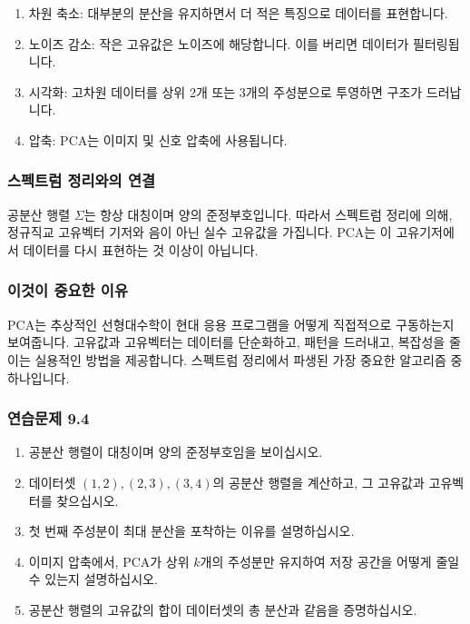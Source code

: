 \documentclass[
  12pt,
  a4paper,
]{article}
\begin{document}
\begin{enumerate}
\def\labelenumi{\arabic{enumi}.}
\item
  차원 축소: 대부분의 분산을 유지하면서 더 적은 특징으로 데이터를 표현합니다.
\item
  노이즈 감소: 작은 고유값은 노이즈에 해당합니다. 이를 버리면 데이터가 필터링됩니다.
\item
  시각화: 고차원 데이터를 상위 2개 또는 3개의 주성분으로 투영하면 구조가 드러납니다.
\item
  압축: PCA는 이미지 및 신호 압축에 사용됩니다.
\end{enumerate}

\subsubsection{스펙트럼 정리와의 연결}\label{connection-to-the-spectral-theorem}

공분산 행렬 \(\Sigma\)는 항상 대칭이며 양의 준정부호입니다. 따라서 스펙트럼 정리에 의해, 정규직교 고유벡터 기저와 음이 아닌 실수 고유값을 가집니다. PCA는 이 고유기저에서 데이터를 다시 표현하는 것 이상이 아닙니다.

\subsubsection{이것이 중요한 이유}\label{why-this-matters-35}

PCA는 추상적인 선형대수학이 현대 응용 프로그램을 어떻게 직접적으로 구동하는지 보여줍니다. 고유값과 고유벡터는 데이터를 단순화하고, 패턴을 드러내고, 복잡성을 줄이는 실용적인 방법을 제공합니다. 스펙트럼 정리에서 파생된 가장 중요한 알고리즘 중 하나입니다.

\subsubsection{연습문제 9.4}\label{exercises-94}

\begin{enumerate}
\def\labelenumi{\arabic{enumi}.}
\item
  공분산 행렬이 대칭이며 양의 준정부호임을 보이십시오.
\item
  데이터셋 \((1,2), (2,3), (3,4)\)의 공분산 행렬을 계산하고, 그 고유값과 고유벡터를 찾으십시오.
\item
  첫 번째 주성분이 최대 분산을 포착하는 이유를 설명하십시오.
\item
  이미지 압축에서, PCA가 상위 \(k\)개의 주성분만 유지하여 저장 공간을 어떻게 줄일 수 있는지 설명하십시오.
\item
  공분산 행렬의 고유값의 합이 데이터셋의 총 분산과 같음을 증명하십시오.
\end{enumerate}
\end{document}
